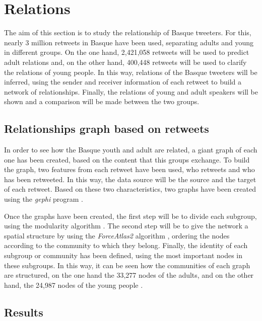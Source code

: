 \documentclass[information,article,submit,moreauthors,pdftex,10pt,a4paper]{Definitions/mdpi}
\begin{document}

\section{Relations}\label{sec:connections}

The aim of this section is to study the relationship of Basque tweeters. For this, nearly 3 million retweets in Basque have been used, separating adults and young in different groups. On the one hand, 2,421,058 retweets will be used to predict adult relations and, on the other hand, 400,448 retweets will be used to clarify the relations of young people. In this way, relations of the Basque tweeters will be inferred, using the sender and receiver information of each retweet to build a network of relationships. Finally, the relations of young and adult speakers will be shown and a comparison will be made between the two groups.

\subsection{Relationships graph based on retweets} 
\label{sec:sis harr}

In order to see how the Basque youth and adult are related, a giant graph of each one has been created, based on the content that this groups exchange. To build the graph, two features from each retweet have been used, who retweets and who has been retweeted. In this way, the data source will be the source and the target of each retweet. Based on these two characteristics, two graphs have been created using the \textit{gephi} program \citep{bastian2009gephi}.

Once the graphs have been created, the first step will be to divide each subgroup, using the modularity algorithm \citep{blondel2008fast}. The second step will be to give the network a spatial structure by using the \textit{ForceAtlas2} algorithm \citep{jacomy2014forceatlas2}, ordering the nodes according to the community to which they belong. Finally, the identity of each subgroup or community has been defined, using the most important nodes in these subgroups. In this way, it can be seen how the communities of each graph are structured, on the one hand the 33,277 nodes of the adults, and on the other hand, the 24,987 nodes of the young people .

\subsection{Results}
\label{sec:emaitz analisi harr}
\end{document}
